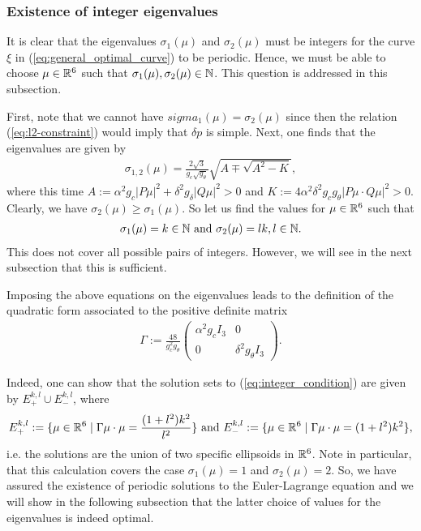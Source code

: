 \subsubsection{Existence of integer eigenvalues}
It is clear that the eigenvalues $\sigma_1(\mu)$ and $\sigma_2(\mu)$ must be integers for the curve $\xi$ in (\ref{eq:general_optimal_curve}) to be periodic. Hence, we must be able to choose $\mu \in \mathbb{R}^6$ such that $\sigma_1(\mu), \sigma_2(\mu) \in \mathbb{N}$. This question is addressed in this subsection.

First, note that we cannot have $sigma_1(\mu) = \sigma_2(\mu)$ since then the relation (\ref{eq:l2-constraint}) would imply that $\delta p$ is simple. Next, one finds that the eigenvalues are given by
\begin{align}
	\sigma_{1,2}(\mu) = \frac{2 \sqrt{3}}{g_c \sqrt{g_\theta}} \sqrt{A \mp \sqrt{A^2 - K}},
\end{align}
where this time $A := \alpha^2 g_c |P \mu|^2 + \delta^2 g_{\delta} |Q \mu|^2 > 0$ and $K := 4 \alpha^2 \delta^2 g_c g_\theta |P\mu \cdot Q \mu|^2 > 0$. Clearly, we have $\sigma_2(\mu) \geq \sigma_1(\mu)$. So let us find the values for $\mu \in \mathbb{R}^6$ such that
\begin{align}
\label{eq:integer_condition}
	\sigma_1(\mu) = k \in \mathbb{N} \text{ and } \sigma_2(\mu) = lk, l \in \mathbb{N}.
\end{align}
This does not cover all possible pairs of integers. However, we will see in the next subsection that this is sufficient.

Imposing the above equations on the eigenvalues leads to the definition of the quadratic form associated to the positive definite matrix
\begin{align}
	\Gamma := \frac{48}{g_c^2 g_\theta} \left (\begin{array}{cc}
	\alpha^2 g_c I_3 & 0 \\ 
	0 & \delta^2 g_\theta I_3
	\end{array}  \right ).
\end{align}

Indeed, one can show that the solution sets to (\ref{eq:integer_condition}) are given by $E_+^{k,l} \cup E_{-}^{k,l}$, where
\begin{align}
E_+^{k,l} := \{\mu \in \mathbb{R}^6 \mid \Gamma \mu \cdot \mu = \frac{(1 + l^2)k^2}{l^2}\} \text{ and } E_{-}^{k,l} := \{\mu \in \mathbb{R}^6 \mid \Gamma \mu \cdot \mu = (1 + l^2)k^2\},
\end{align}
i.e. the solutions are the union of two specific ellipsoids in $\mathbb{R}^6$. Note in particular, that this calculation covers the case $\sigma_1(\mu) = 1$ and $\sigma_2(\mu) = 2$. So, we have assured the existence of periodic solutions to the Euler-Lagrange equation and we will show in the following subsection that the latter choice of values for the eigenvalues is indeed optimal.

